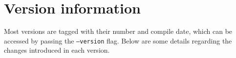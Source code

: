 \section{Version information}
Most versions are tagged with their number and compile date, which can be accessed by passing the \texttt{--version} flag. Below are some details regarding the changes introduced in each version.
